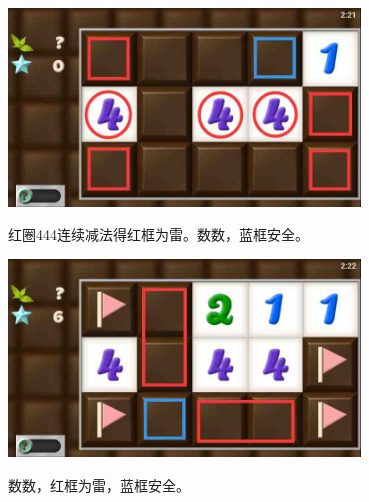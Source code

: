 \subsection{} %
\begin{center}
    \includegraphics[width=0.7\textwidth]{puzzlelow/30-1.jpg}
\end{center}
红圈444连续减法得红框为雷。数数，蓝框安全。
\begin{center}
    \includegraphics[width=0.7\textwidth]{puzzlelow/30-2.jpg}
\end{center}
数数，红框为雷，蓝框安全。

